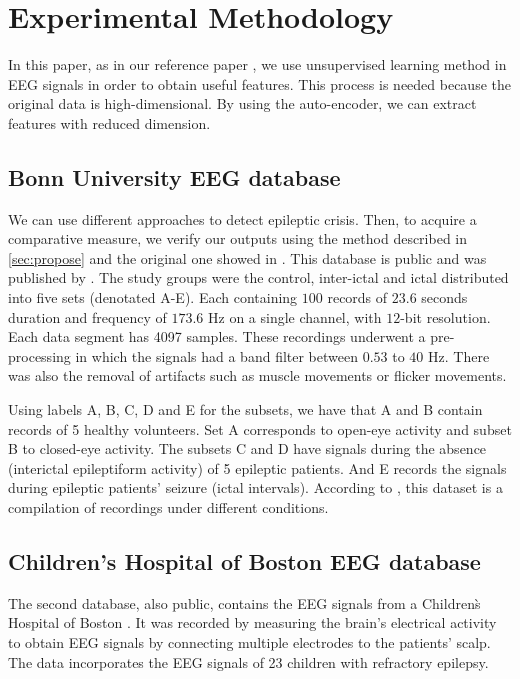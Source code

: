 \section{Experimental Methodology}
\label{sec:metho}
In this paper, as in our reference paper \cite{WenZha:2018}, we use unsupervised learning method in EEG signals in order to obtain useful features. This process is needed because the original data is high-dimensional. By using the auto-encoder, we can extract features with reduced dimension.

\subsection{Bonn University EEG database}

We can use different approaches to detect epileptic crisis. Then, to acquire a comparative measure, we verify our outputs using the method described in \ref{sec:propose} and the original one showed in \cite{WenZha:2018}. This database is public and was published by \cite{andrzejak}. The study groups were the control, inter-ictal and ictal distributed into five sets (denotated A-E). Each containing $100$ records of $23.6$ seconds duration and frequency of $173.6$ Hz on a single channel, with $12$-bit resolution. Each data segment has 4097 samples. These recordings underwent a pre-processing in which the signals had a band filter between $0.53$ to $40$ Hz. There was also the removal of artifacts such as muscle movements or flicker movements.

Using labels A, B, C, D and E for the subsets, we have that A and B contain records of 5 healthy volunteers. Set A corresponds to open-eye activity and subset B to closed-eye activity. The subsets C and D have signals during the absence (interictal epileptiform activity) of 5 epileptic patients. And E records the signals during epileptic patients' seizure (ictal intervals). According to \cite{kamath2015analysis}, this dataset is a compilation of recordings under different conditions.

\subsection{Children's Hospital of Boston EEG database}

The second database, also public, contains the EEG signals from a Children\`s Hospital of Boston
\cite{Shoeb}. It was recorded by measuring the brain's electrical activity to obtain EEG signals by connecting multiple electrodes to the patients’ scalp. The data incorporates the EEG signals of 23 children with refractory epilepsy.

